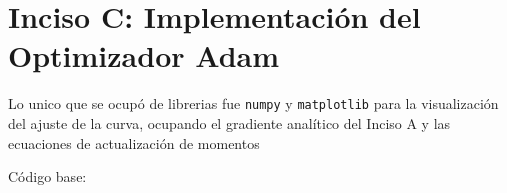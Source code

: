 \section{Inciso C: Implementación del Optimizador Adam}

Lo unico que se ocupó de librerias fue \texttt{numpy} y \texttt{matplotlib} para la visualización del ajuste de la curva, ocupando el gradiente analítico del Inciso A y las ecuaciones de actualización de momentos

Código base:

